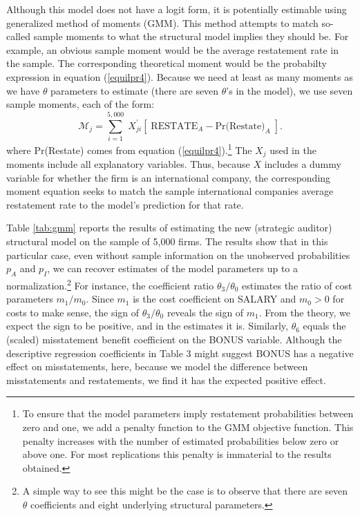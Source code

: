 Although this model does not have a logit form, it is potentially estimable using 
generalized method of moments (GMM).
This method attempts to match so-called sample moments to what the structural model implies they should be. 
For example, an obvious sample moment would be the average restatement rate in the sample.
The corresponding theoretical moment would be the probabilty expression in equation (\ref{equilpr4}).
Because we need at least as many moments as we have $\theta$ parameters to estimate (there are seven $\theta$'s in the model), we use seven sample moments, each of the form:
$$ \mathcal{M}_j = \sum_{i=1}^{5,000} \; X_{ji}^\prime\left[\; \mbox{RESTATE}_A - \mbox{Pr(Restate)}_A \; \right]. $$
where Pr(Restate) comes from equation (\ref{equilpr4}).\footnote{
To ensure that the model parameters imply restatement probabilities between zero and one, we add a penalty function to the GMM objective function.
This penalty increases with the number of estimated probabilities below zero or above one.
For most replications this penalty is immaterial to the results obtained.} 
The $X_j$ used in the moments include all explanatory variables. 
Thus, because $X$ includes  a dummy variable for whether the firm is an international company, the corresponding moment equation seeks to match the sample international companies average restatement rate to the model's prediction for that rate.

Table \ref{tab:gmm} reports the results of estimating the new (strategic auditor) structural model on the sample of 5,000 firms. 
The results show that in this particular case, even without sample information on the unobserved probabilities $p_A$ and $p_I$, we can recover estimates of the model parameters up to a normalization.\footnote{
A simple way to see this might be the case is to observe that there are seven $\theta$ coefficients and eight underlying structural parameters.}
For instance, the coefficient ratio $\theta_3/\theta_0$ estimates the ratio of cost parameters $m_1/m_0$.
Since $m_1$ is the cost coefficient on SALARY and $m_0>0$ for costs to make sense, the sign of $\theta_3/\theta_0$ reveals the sign of $m_1$.
From the theory, we expect the sign to be positive, and in the estimates it is. 
Similarly, $\theta_6$ equals the (scaled) misstatement benefit coefficient on the BONUS variable.
Although the descriptive regression coefficients in Table 3 might suggest BONUS has a negative effect on misstatements, here, because we model the difference between misstatements and restatements, we find it has the expected positive effect.

